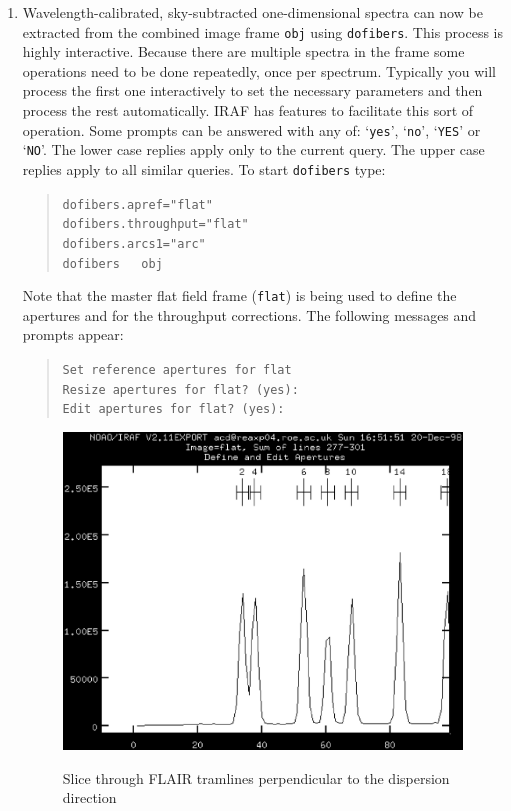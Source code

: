 \documentclass[twoside,11pt]{article}
\begin{document}
\begin{enumerate}
  \item Wavelength-calibrated, sky-subtracted one-dimensional spectra
   can now be extracted from the combined image frame {\tt obj} using
   {\tt dofibers}.  This process is highly interactive.  Because there
   are multiple spectra in the frame some operations need to be done
   repeatedly, once per spectrum.  Typically you will process the first
   one interactively to set the necessary parameters and then process
   the rest automatically.  IRAF has features to facilitate this sort
   of operation.  Some prompts can be answered with any of:
   `{\tt yes}', `{\tt no}', `{\tt YES}' or `{\tt NO}'.  The lower
   case replies apply only to the current query.  The upper case
   replies apply to all similar queries.  To start {\tt dofibers} type:

  \begin{quote}
   {\tt dofibers.apref="flat" \\
   dofibers.throughput="flat" \\
   dofibers.arcs1="arc"       \\
   dofibers ~ obj}
  \end{quote}

   Note that the master flat field frame ({\tt flat}) is being used to
   define the apertures and for the throughput corrections.  The following
   messages and prompts appear:

  \begin{quote}
   {\tt Set reference apertures for flat  \\
   Resize apertures for flat?  (yes):     \\
   Edit apertures for flat?  (yes): }
  \end{quote}

  \begin{figure}[htbp]
     \centering
     \includegraphics[totalheight=4in]{sc14_flair_tram.ps}
     \begin{quote}
     \caption{Slice through FLAIR tramlines perpendicular to the
      dispersion direction
     \label{FLAIR_TRAM} }
     \end{quote}
  \end{figure}


\end{enumerate}
\end{document}
